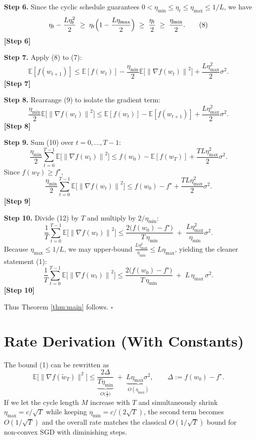 \documentclass{article}
\newcommand{\E}{\mathbb{E}}
\newcommand{\norm}[1]{\left\lVert #1\right\rVert}
\begin{document}
\noindent\textbf{Step 6.} Since the cyclic schedule guarantees $0<\eta_{\min}\le\eta_{t}\le\eta_{\max}\le 1/L$, we have
\[
\eta_{t}-\frac{L\eta_{t}^{2}}{2}
\;\ge\;
\eta_{t}\Bigl(1-\frac{L\eta_{\max}}{2}\Bigr)
\;\ge\;
\frac{\eta_{t}}{2}
\;\ge\;
\frac{\eta_{\min}}{2}.
\tag{8}
\]
\textbf{[Step 6]}

\noindent\textbf{Step 7.} Apply (8) to (7):
\[
\E[f(w_{t+1})]
\le \E[f(w_{t})]
   -\frac{\eta_{\min}}{2}\E\!\bigl[\norm{\nabla f(w_{t})}^{2}\bigr]
   +\frac{L\eta_{\max}^{2}}{2}\sigma^{2}.
\tag{9}
\]
\textbf{[Step 7]}

\noindent\textbf{Step 8.} Rearrange (9) to isolate the gradient term:
\[
\frac{\eta_{\min}}{2}\E\!\bigl[\norm{\nabla f(w_{t})}^{2}\bigr]
\le \E[f(w_{t})]-\E[f(w_{t+1})]
      +\frac{L\eta_{\max}^{2}}{2}\sigma^{2}.
\tag{10}
\]
\textbf{[Step 8]}

\noindent\textbf{Step 9.} Sum (10) over $t=0,\dots,T-1$:
\[
\frac{\eta_{\min}}{2}\sum_{t=0}^{T-1}\E\!\bigl[\norm{\nabla f(w_{t})}^{2}\bigr]
\le f(w_{0})- \E[f(w_{T})] + \frac{TL\eta_{\max}^{2}}{2}\sigma^{2}.
\tag{11}
\]
Since $f(w_{T})\ge f^{\star}$,
\[
\frac{\eta_{\min}}{2}\sum_{t=0}^{T-1}\E\!\bigl[\norm{\nabla f(w_{t})}^{2}\bigr]
\le f(w_{0})-f^{\star}+ \frac{TL\eta_{\max}^{2}}{2}\sigma^{2}.
\tag{12}
\]
\textbf{[Step 9]}

\noindent\textbf{Step 10.} Divide (12) by $T$ and multiply by $2/\eta_{\min}$:
\[
\frac{1}{T}\sum_{t=0}^{T-1}\E\!\bigl[\norm{\nabla f(w_{t})}^{2}\bigr]
\le
\frac{2\bigl(f(w_{0})-f^{\star}\bigr)}{T\,\eta_{\min}}
\;+\;
\frac{L\eta_{\max}^{2}}{\eta_{\min}}\sigma^{2}.
\tag{13}
\]
Because $\eta_{\max}\le 1/L$, we may upper‑bound $\frac{L\eta_{\max}^{2}}{\eta_{\min}}\le L\eta_{\max}$, yielding the cleaner statement (1):
\[
\frac{1}{T}\sum_{t=0}^{T-1}\E\!\bigl[\norm{\nabla f(w_{t})}^{2}\bigr]
\le
\frac{2\bigl(f(w_{0})-f^{\star}\bigr)}{T\,\eta_{\min}}
\;+\;
L\,\eta_{\max}\,\sigma^{2}.
\]
\textbf{[Step 10]}

Thus Theorem \ref{thm:main} follows. \hfill $\square$

\section*{Rate Derivation (With Constants)}
The bound (1) can be rewritten as
\[
\mathbb{E}\bigl[\|\nabla f(\tilde w_T)\|^2\bigr]
\le
\underbrace{\frac{2\Delta}{T\eta_{\min}}}_{\displaystyle O\!\bigl(\tfrac{1}{T}\bigr)}
\;+\;
\underbrace{L\eta_{\max}\sigma^{2}}_{\displaystyle O(\eta_{\max})},
\qquad
\Delta:=f(w_{0})-f^{\star}.
\]
If we let the cycle length $M$ increase with $T$ and simultaneously shrink $\eta_{\max}=c/\sqrt{T}$ while keeping $\eta_{\min}=c/(2\sqrt{T})$, the second term becomes $O(1/\sqrt{T})$ and the overall rate matches the classical $O(1/\sqrt{T})$ bound for non‑convex SGD with diminishing steps.
\end{document}
